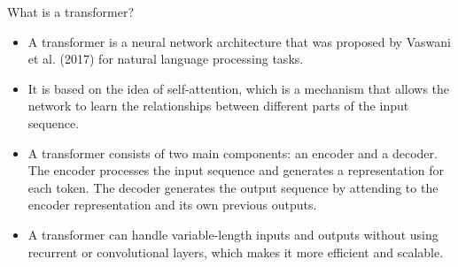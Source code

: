 \documentclass[USenglish,pdftex,compress,10pt,svgnamesi,handout]{beamer}
\begin{document}
\begin{frame}{What is a transformer?}
\begin{itemize}
    \item A transformer is a neural network architecture that was proposed by Vaswani et al. (2017) for natural language processing tasks.
    \item It is based on the idea of self-attention, which is a mechanism that allows the network to learn the relationships between different parts of the input sequence.
    \item A transformer consists of two main components: an encoder and a decoder. The encoder processes the input sequence and generates a representation for each token. The decoder generates the output sequence by attending to the encoder representation and its own previous outputs.
    \item A transformer can handle variable-length inputs and outputs without using recurrent or convolutional layers, which makes it more efficient and scalable.
\end{itemize}
\end{frame}
\end{document}
